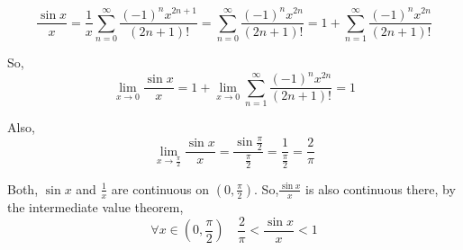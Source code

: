 \documentclass{article}
\begin{document}
\[\frac{\sin x}{x} = \frac{1}{x} \sum_{n=0}^\infty
  \frac{(-1)^nx^{2n+1}}{(2n+1)!} = \sum_{n=0}^\infty
  \frac{(-1)^nx^{2n}}{(2n+1)!}  = 1 + \sum_{n=1}^\infty
  \frac{(-1)^nx^{2n}}{(2n+1)!}\]

So,  \[\lim_{x\rightarrow 0} \frac{\sin x}{x} = 1 + \lim_{x\rightarrow
  0} \sum_{n=1}^\infty
\frac{(-1)^nx^{2n}}{(2n+1)!} = 1\]

Also, \[\lim_{x\rightarrow \frac{\pi}{2}} \frac{\sin x}{x} =
  \frac{\sin \frac{\pi}{2}}{\frac{\pi}{2}} = \frac{1}{\frac{\pi}{2}}
  = \frac{2}{\pi}\]

Both, $\sin x$ and $\frac{1}{x}$ are continuous on $\left(  0,
  \frac{\pi}{2}\right)$. So,$\frac{\sin{x}}{x}$ is also continuous
there, by the intermediate value theorem,\[\forall x \in \left(  0,
  \frac{\pi}{2}\right)\quad \frac{2}{\pi} <
  \frac{\sin{x}}{x} < 1 \]
\end{document}
